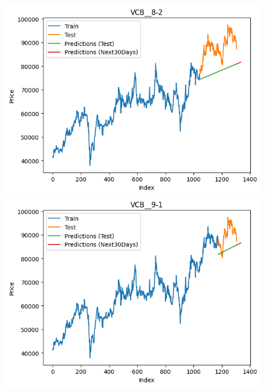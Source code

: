 \begin{figure}[H]
\begin{minipage}{0.15\textwidth}
    \includegraphics[width=1\textwidth]{resources/chapter-5/newdata/result/VCB_LinearRegression_8-2.png}
    \end{minipage}
    \hfill
        \begin{minipage}{0.15\textwidth}
    \centering
    \includegraphics[width=1\textwidth]{resources/chapter-5/newdata/result/VCB_LinearRegression_9-1.png}
    \end{minipage}
    \hfill
    \begin{minipage}{0.15\textwidth}
    \centering

\end{minipage}
\end{figure}
